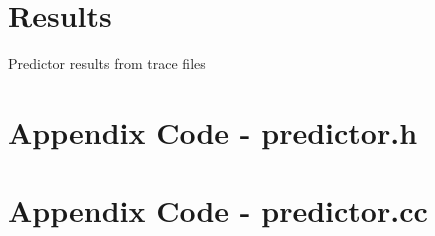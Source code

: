 \documentclass[twocolumn]{article}
\begin{document}










\section{Results}
Predictor results from trace files


\onecolumn
\section{Appendix Code - predictor.h}

\section{Appendix Code - predictor.cc}

\end{document}
